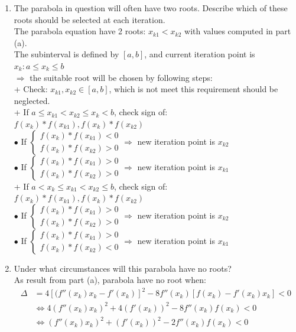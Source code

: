 \documentclass[14pt,a4paper]{article}
\begin{document}
\begin{enumerate}
	\label{4c}
	\item The parabola in question will often have two roots. Describe which of these roots should be selected at each iteration.\\
	The parabola equation have 2 roots: $x_{k1} < x_{k2}$ with values computed in part (a).\\
	The subinterval is defined by $[a,b]$, and current iteration point is $x_k: a\leq x_k \leq b$ \\
	$\Rightarrow$ the suitable root will be chosen by following steps:\\
	+ Check: $x_{k1}, x_{k2} \in [a,b]$, which is not meet this requirement should be neglected. \\
	+ If $a \leq x_{k1} < x_{k2} \leq x_k < b$, check sign of: $f(x_k)*f(x_{k1}),  f(x_k)*f(x_{k2})$\\
	\hspace*{2cm} $\bullet$ If $\begin{cases} f(x_k)*f(x_{k1}) < 0 \\ f(x_k)*f(x_{k2}) > 0 \end{cases} \Rightarrow $ new iteration point is $x_{k2}$\\
	\hspace*{2cm} $\bullet$ If $\begin{cases} f(x_k)*f(x_{k1}) > 0 \\ f(x_k)*f(x_{k2}) > 0 \end{cases} \Rightarrow $ new iteration point is $x_{k1}$\\
	+ If $a < x_k \leq x_{k1} < x_{k2} \leq b$, check sign of: $f(x_k)*f(x_{k1}),  f(x_k)*f(x_{k2})$\\
	\hspace*{2cm} $\bullet$ If $\begin{cases} f(x_k)*f(x_{k1}) > 0 \\ f(x_k)*f(x_{k2}) > 0 \end{cases} \Rightarrow $ new iteration point is $x_{k2}$\\
	\hspace*{2cm} $\bullet$ If $\begin{cases} f(x_k)*f(x_{k1}) > 0 \\ f(x_k)*f(x_{k2}) < 0 \end{cases} \Rightarrow $ new iteration point is $x_{k1}$\\
		
	\label{4d}
	\item Under what circumstances will this parabola have no roots?\\
	As result from part (a), parabola have no root when:
	\begin{align*} \Delta &= 4 \left[(f''(x_k)x_k - f'(x_k)\right]^2 - 8f''(x_k)\left[f(x_k) - f'(x_k)x_k\right] < 0\\
	&\Leftrightarrow 4(f''(x_k)x_k)^2 + 4(f'(x_k))^2 - 8f''(x_k)f(x_k) < 0 \\
	&\Leftrightarrow (f''(x_k)x_k)^2 + (f'(x_k))^2 - 2f''(x_k)f(x_k) < 0 \end{align*}


\end{enumerate}
\end{document}
